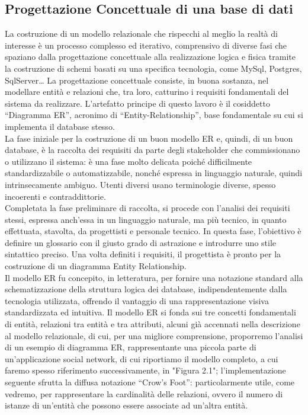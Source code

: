\documentclass[a4paper,12pt]{report}
\begin{document}
\subsection{Progettazione Concettuale di una base di dati}
La costruzione di un modello relazionale che rispecchi al meglio la realtà di interesse è un processo complesso ed iterativo, comprensivo di diverse fasi che spaziano dalla progettazione concettuale alla realizzazione logica e fisica tramite la costruzione di schemi basati su una specifica tecnologia, come MySql, Postgres, SqlServer…
La progettazione concettuale consiste, in buona sostanza, nel modellare entità e relazioni che, tra loro, catturino i requisiti fondamentali del sistema da realizzare. L'artefatto principe di questo lavoro è il cosiddetto “Diagramma ER”, acronimo di “Entity-Relationship”, base fondamentale su cui si implementa il database stesso.
\\[0ex]
La fase iniziale per la costruzione di un buon modello ER e, quindi, di un buon database, è la raccolta dei requisiti da parte degli stakeholder che commissionano o utilizzano il sistema: è una fase molto delicata poiché difficilmente standardizzabile o automatizzabile, nonché espressa in linguaggio naturale, quindi intrinsecamente ambiguo. Utenti diversi usano terminologie diverse, spesso incoerenti e contraddittorie.
\\[0ex]
Completata la fase preliminare di raccolta, si procede con l'analisi dei requisiti stessi, espressa anch’essa in un linguaggio naturale, ma più tecnico, in quanto effettuata, stavolta, da progettisti e personale tecnico. In questa fase, l'obiettivo è definire un glossario con il giusto grado di astrazione e introdurre uno stile sintattico preciso. Una volta definiti i requisiti, il progettista è pronto per la costruzione di un diagramma Entity Relationship.
\\[0ex]
Il modello ER fu concepito, in letteratura, per fornire una notazione standard alla schematizzazione della struttura logica dei database, indipendentemente dalla tecnologia utilizzata, offrendo il vantaggio di una rappresentazione visiva standardizzata ed intuitiva. Il modello ER si fonda sui tre concetti fondamentali di entità, relazioni tra entità e tra attributi, alcuni già accennati nella descrizione al modello relazionale, di cui, per una migliore comprensione, proporremo l’analisi di un esempio di diagramma ER, rappresentante una piccola parte di un’applicazione social network, di cui riportiamo il modello completo, a cui faremo spesso riferimento successivamente, in "Figura 2.1"; l’implementazione seguente sfrutta la diffusa notazione “Crow’s Foot”: particolarmente utile, come vedremo, per rappresentare la cardinalità delle relazioni, ovvero il numero di istanze di un'entità che possono essere associate ad un'altra entità. 
\newpage
\end{document}
